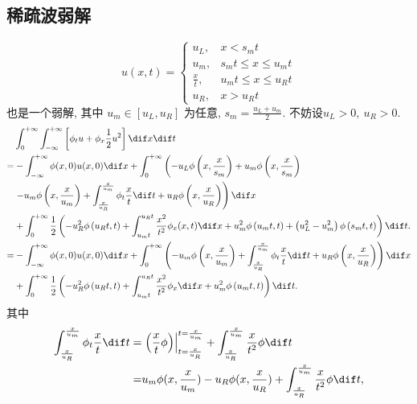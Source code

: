\documentclass[12pt]{article}
\begin{document}
\subsection{稀疏波弱解}

\begin{equation}
	u(x, t)=
	\begin{cases}
		u_{L}, & x<s_{m} t \\
		u_{m}, & s_{m} t \leq x \leq u_{m} t \\
		\frac{x}{t}, & u_{m} t \leq x \leq u_{R} t \\
		u_{R}, & x>u_{R} t
	\end{cases}
\end{equation}
也是一个弱解, 其中 $u_{m} \in\left[u_{L}, u_{R}\right]$ 为任意, $s_{m}=\frac{u_{L}+u_{m}}{2} .$ 不妨设$u_L>0,\ u_R>0$.
\begin{align}
	& \int_{0}^{+\infty} \int_{-\infty}^{+\infty}\left[\phi_{t} {u}+\phi_{x} \frac{1}{2}u^2\right] \dif x \dif t \\
	= & -\int_{-\infty}^{+\infty} \phi(x, 0) {u}(x, 0) \dif x + \int_{0}^{+\infty} \left( - u_{L} \phi\left(x, \frac{x}{s_{m}}\right)+u_{m} \phi\left(x, \frac{x}{s_{m}}\right)\right. \\
	&\left.-u_{m} \phi\left(x, \frac{x}{u_{m}}\right)+\int_{\frac{x}{u_{R}}}^{\frac{x}{u_m}} \phi_{t} \frac{x}{t} \dif t + u_{R} \phi\left(x, \frac{x}{u_{R}}\right) \right) \dif x\\
	& + \int_{0}^{+\infty} \frac{1}{2} \left(- u_{R}^{2} \phi\left(u_{R} t, t\right)+\int_{u_{m} t}^{u_{R} t}  \frac{x^{2}}{t^{2}} \phi_{x}(x, t) \dif x +  u_{m}^{2} \phi\left(u_{m} t, t\right) + \left(u_{L}^{2}- u_{m}^{2}\right)  \phi\left(s_{m} t, t\right) \right) \dif t.\\
	= & -\int_{-\infty}^{+\infty} \phi(x, 0) {u}(x, 0) \dif x + \int_{0}^{+\infty} \left(-u_{m} \phi\left(x, \frac{x}{u_{m}}\right)+\int_{\frac{x}{u_{R}}}^{\frac{x}{u_m}} \phi_{t} \frac{x}{t} \dif t + u_{R} \phi\left(x, \frac{x}{u_{R}}\right) \right) \dif x\\
	& + \int_{0}^{+\infty} \frac{1}{2} \left(- u_{R}^{2} \phi\left(u_{R} t, t\right)+\int_{u_{m} t}^{u_{R} t}  \frac{x^{2}}{t^{2}} \phi_{x} \dif x +  u_{m}^{2} \phi\left(u_{m} t, t\right)  \right) \dif t.
\end{align}
其中
\begin{align}
	\int_{\frac{x}{u_{R}}}^{\frac{x}{u_m}} \phi_{t} \frac{x}{t} \dif t = & 	\left.\left(\frac{x}{t} \phi\right)\right|_{t=\frac{x}{u_{R}}} ^{t=\frac{x}{u_{m}}}+\int_{\frac{x}{u_{R}}}^{\frac{x}{u_{m}}} \frac{x}{t^{2}} \phi \dif t \\
	= & u_m \phi(x,\frac{x}{u_m}) -  u_R \phi(x,\frac{x}{u_R})+\int_{\frac{x}{u_{R}}}^{\frac{x}{u_{m}}} \frac{x}{t^{2}} \phi \dif t,
\end{align}
\end{document}
